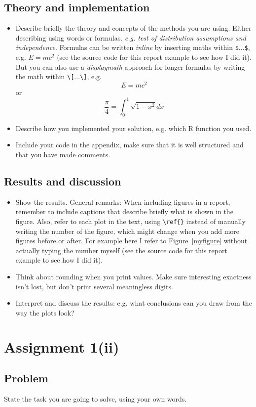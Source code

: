 \documentclass[11pt, a4paper]{article}
\begin{document}
\subsection{Theory and implementation}
\begin{itemize}
\item Describe briefly the theory and concepts of the methods you are using. Either describing using words or formulas. \emph{e.g. test of distribution assumptions and independence}. Formulas can be written \textit{inline} by inserting maths within \verb|$|...\verb|$|, e.g. $E=mc^2$ (see the source code for this report example to see how I did it). But you can also use a \textit{displaymath} approach for longer formulas by writing the math within \verb|\[|...\verb|\]|, e.g.
\[
E=mc^2
\]
or
\[
\frac{\pi}{4}=\int_0^1 \sqrt{1-x^2}dx
\]
\item Describe how you implemented your solution, e.g. which R function you used.
\item Include your code in the appendix, make sure that it is well structured and that you have made comments.
\end{itemize}
\subsection{Results and discussion}
\begin{itemize}
\item Show the results. General remarks: When including figures in a report, remember to include captions that describe briefly what is shown in the figure. Also, refer to each plot in the text, using \verb|\ref{}| instead of manually writing the number of the figure, which might change when you add more figures before or after. For example here I refer to Figure~\ref{myfigure}  without actually typing the number myself (see the source code for this report example to see how I did it).
\item Think about rounding when you print values. Make sure interesting exactness isn't lost, but don't print several meaningless digits.
\item Interpret and discuss the results: e.g. what conclusions can you draw from the way the plots look?
\end{itemize}

\section{Assignment 1(ii)}
\subsection{Problem}
State the task you are going to solve, using your own words.
\end{document}
